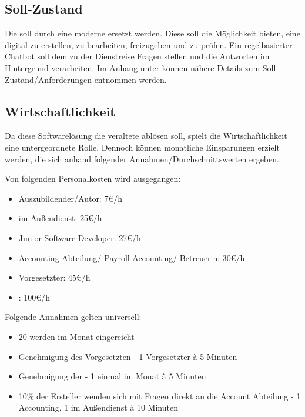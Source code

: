 \subsection{Soll-Zustand}

Die  soll durch eine moderne  ersetzt werden. Diese   soll die Möglichkeit bieten, eine  digital zu erstellen, zu bearbeiten, freizugeben und zu prüfen. Ein regelbasierter Chatbot soll dem  zu der Dienstreise Fragen stellen und die Antworten im Hintergrund verarbeiten. Im Anhang unter  können nähere Details zum Soll-Zustand/Anforderungen entnommen werden.


\subsection{Wirtschaftlichkeit}
Da diese Softwarelösung die veraltete  ablösen soll, spielt die Wirtschaftlichkeit eine untergeordnete Rolle. Dennoch können monatliche Einsparungen erzielt werden, die sich anhand folgender Annahmen/Durchschnittswerten ergeben.

Von folgenden Personalkosten wird ausgegangen:
\begin{itemize}
\item Auszubildender/Autor: 7€/h
\item {} im Außendienst: 25€/h
\item Junior Software Developer: 27€/h
\item Accounting Abteilung/ Payroll Accounting/ Betreuerin: 30€/h
\item Vorgesetzter: 45€/h
\item {}: 100€/h
\end{itemize}

Folgende Annahmen gelten universell:
\begin{itemize}
\item 20  werden im Monat eingereicht
\item Genehmigung des Vorgesetzten - 1 Vorgesetzter à 5 Minuten
\item Genehmigung der  - 1  einmal im Monat à 5 Minuten
\item 10\% der Ersteller wenden sich mit Fragen direkt an die Account Abteilung - 1  Accounting, 1  im Außendienst à 10 Minuten
\end{itemize}

